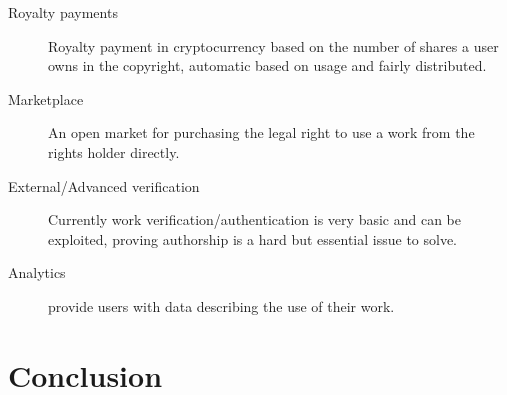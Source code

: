 \documentclass[12pt]{article}
\begin{document}
\begin{description}
	\item[Royalty payments] Royalty payment in cryptocurrency based on the number of shares a user owns in the copyright, automatic based on usage and fairly distributed.
	\item[Marketplace] An open market for purchasing the legal right to use a work from the rights holder directly.
	\item[External/Advanced verification] Currently work verification/authentication is very basic and can be exploited, proving authorship is a hard but essential issue to solve.
	\item[Analytics] provide users with data describing the use of their work.
\end{description}

\section{Conclusion}

%



\end{document}
